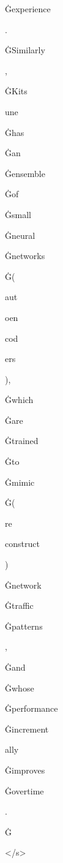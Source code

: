 \documentclass[varwidth]{standalone}
\begin{document}
\begin{CJK*}{UTF8}{gbsn}
{{{\colorbox{red!0.41777366}{\strut Ġexperience} \colorbox{red!52.92656}{\strut .} \colorbox{red!0.36171412}{\strut ĠSimilarly} \colorbox{red!0.43028215}{\strut ,} \colorbox{red!0.29614252}{\strut ĠKits} \colorbox{red!0.3046176}{\strut une} \colorbox{red!0.33280215}{\strut Ġhas} \colorbox{red!0.45409286}{\strut Ġan} \colorbox{red!0.6337733}{\strut Ġensemble} \colorbox{red!0.38941917}{\strut Ġof} \colorbox{red!0.797813}{\strut Ġsmall} \colorbox{red!1.7861387}{\strut Ġneural} \colorbox{red!0.7781089}{\strut Ġnetworks} \colorbox{red!0.6327302}{\strut Ġ(} \colorbox{red!0.6835802}{\strut aut} \colorbox{red!0.7735364}{\strut oen} \colorbox{red!0.5175367}{\strut cod} \colorbox{red!0.27314204}{\strut ers} \colorbox{red!0.33512726}{\strut ),} \colorbox{red!0.2970793}{\strut Ġwhich} \colorbox{red!0.22154914}{\strut Ġare} \colorbox{red!0.6553089}{\strut Ġtrained} \colorbox{red!0.2331761}{\strut Ġto} \colorbox{red!0.6928665}{\strut Ġmimic} \colorbox{red!0.50939417}{\strut Ġ(} \colorbox{red!0.55938005}{\strut re} \colorbox{red!0.5282269}{\strut construct} \colorbox{red!0.4693712}{\strut )} \colorbox{red!0.7098863}{\strut Ġnetwork} \colorbox{red!0.73383224}{\strut Ġtraffic} \colorbox{red!0.88381433}{\strut Ġpatterns} \colorbox{red!0.13064803}{\strut ,} \colorbox{red!0.22851369}{\strut Ġand} \colorbox{red!0.43105087}{\strut Ġwhose} \colorbox{red!0.4006268}{\strut Ġperformance} \colorbox{red!0.5166138}{\strut Ġincrement} \colorbox{red!0.75895244}{\strut ally} \colorbox{red!0.6463403}{\strut Ġimproves} \colorbox{red!0.722877}{\strut Ġovertime} \colorbox{red!47.930508}{\strut .} \colorbox{red!0.43633085}{\strut Ġ} \colorbox{red!0.57610285}{\strut </s>} 
}}}
\end{CJK*}
\end{document}
